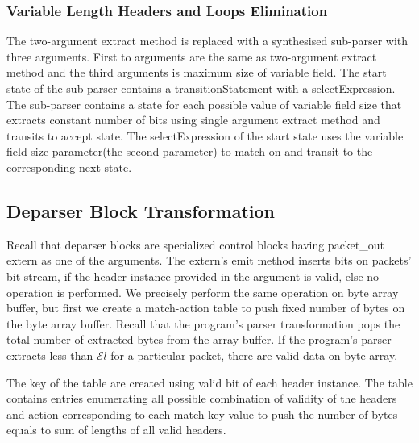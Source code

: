 \documentclass{hotnets19}
\begin{document}
\subsubsection{Variable Length Headers and Loops Elimination}
\label{variable-length-headers-loops-and-elimination}
The two-argument extract method is replaced with a synthesised sub-parser with three arguments.
First to arguments are the same as two-argument extract method and the third arguments is maximum size of variable field.
The start state of the sub-parser contains a transition\-Statement with a select\-Expression.
The sub-parser contains a state for each possible value of variable field size that extracts constant number of bits using single argument extract method and transits to accept state.
The select\-Expression of the start state uses the variable field size parameter(the second parameter) to match on and transit to the corresponding next state.




\subsection{Deparser Block Transformation}
\label{subsection:deparser-block-transformation}
Recall that deparser blocks are specialized control blocks having packet\_out extern as one of the arguments.
The extern's emit method inserts bits on packets' bit-stream, if the header instance provided in the argument is valid, else no operation is performed.
We precisely perform the same operation on byte array buffer, but first we create a match-action table to push fixed number of bytes on the byte array buffer.
Recall that the program's parser transformation pops the total number of extracted bytes from the array buffer.
If the program's parser extracts less than $\mathcal{E}l$ for a particular packet, there are valid data on byte array.

The key of the table are created using valid bit of each header instance.
The table contains entries enumerating all possible combination of validity of the headers and action corresponding to each match key value to push the number of bytes equals to sum of lengths of all valid headers.
\end{document}
